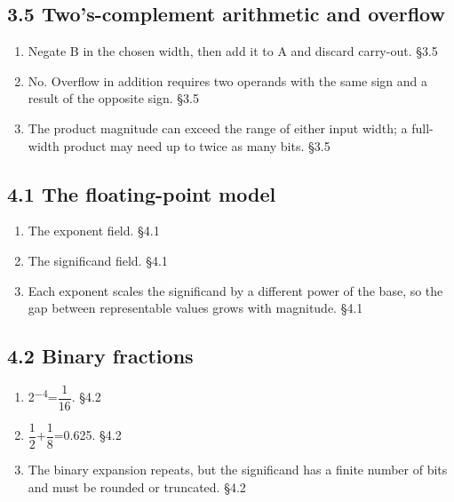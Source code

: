 \documentclass[11pt]{article}
\begin{document}
\begin{keepsection}\subsection{3.5 Two’s-complement arithmetic and overflow}

\begin{enumerate}
\item Negate B in the chosen width, then add it to A and discard carry-out. \hfill{\small\color{FAUblue}§3.5}
\item No. Overflow in addition requires two operands with the same sign and a result of the opposite sign. \hfill{\small\color{FAUblue}§3.5}
\item The product magnitude can exceed the range of either input width; a full-width product may need up to twice as many bits. \hfill{\small\color{FAUblue}§3.5}
\end{enumerate}

\end{keepsection}
\begin{keepsection}\subsection{4.1 The floating-point model}

\begin{enumerate}
\item The exponent field. \hfill{\small\color{FAUblue}§4.1}
\item The significand field. \hfill{\small\color{FAUblue}§4.1}
\item Each exponent scales the significand by a different power of the base, so the gap between representable values grows with magnitude. \hfill{\small\color{FAUblue}§4.1}
\end{enumerate}

\end{keepsection}
\begin{keepsection}\subsection{4.2 Binary fractions}

\begin{enumerate}
\item 2\textsuperscript{\ensuremath{-}4}={\small\ensuremath{\dfrac{1}{16}}}. \hfill{\small\color{FAUblue}§4.2}
\item {\small\ensuremath{\dfrac{1}{2}}}+{\small\ensuremath{\dfrac{1}{8}}}=0.625. \hfill{\small\color{FAUblue}§4.2}
\item The binary expansion repeats, but the significand has a finite number of bits and must be rounded or truncated. \hfill{\small\color{FAUblue}§4.2}
\end{enumerate}

\end{keepsection}
\end{document}
